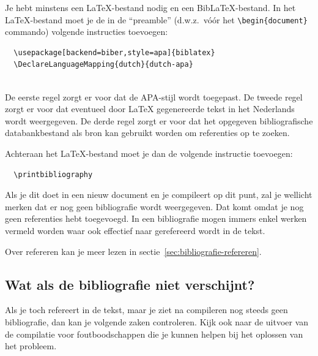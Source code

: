 Je hebt minstens een {\LaTeX}-bestand nodig en een Bib{\LaTeX}-bestand. In het {\LaTeX}-bestand moet je de in de ``preamble'' (d.w.z.\ vóór het \texttt{{\textbackslash}begin\{document\}} comman\-do) volgende instructies toevoegen:

\begin{verbatim}
  \usepackage[backend=biber,style=apa]{biblatex}
  \DeclareLanguageMapping{dutch}{dutch-apa}
  
\end{verbatim}

De eerste regel zorgt er voor dat de APA-stijl wordt toegepast. De tweede regel zorgt er voor dat eventueel door {\LaTeX} gegenereerde tekst in het Nederlands wordt weergegeven. De derde regel zorgt er voor dat het opgegeven bibliografische databankbestand als bron kan gebruikt worden om referenties op te zoeken.

Achteraan het {\LaTeX}-bestand moet je dan de volgende instructie toevoegen:

\begin{verbatim}
  \printbibliography
\end{verbatim}

Als je dit doet in een nieuw document en je compileert op dit punt, zal je wellicht merken dat er nog geen bibliografie wordt weergegeven. Dat komt omdat je nog geen referenties hebt toegevoegd. In een bibliografie mogen immers enkel werken vermeld worden waar ook effectief naar gerefereerd wordt in de tekst.

Over refereren kan je meer lezen in sectie~\ref{sec:bibliografie-refereren}.

\subsection{Wat als de bibliografie niet verschijnt?}%
\label{ssec:wat_als_de_bibliografie_niet_verschijnt}

Als je toch refereert in de tekst, maar je ziet na compileren nog steeds geen bibliografie, dan kan je volgende zaken controleren. Kijk ook naar de uitvoer van de compilatie voor foutboodschappen die je kunnen helpen bij het oplossen van het probleem.


